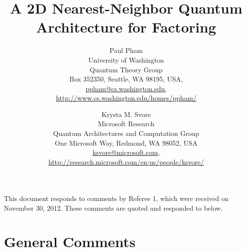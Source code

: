 \documentclass{article}
\newcommand{\email}[1]{\href{mailto:#1}{#1}}
\theoremstyle{plain} \newtheorem{lemma}{Lemma}
\begin{document}

\title{A 2D Nearest-Neighbor Quantum Architecture for Factoring}


%
%
\author{Paul Pham\\
University of Washington\\
Quantum Theory Group\\
Box 352350, Seattle, WA 98195, USA,\\
\email{ppham@cs.washington.edu},\\
\url{http://www.cs.washington.edu/homes/ppham/}
\and
Krysta M. Svore\\
Microsoft Research\\
Quantum Architectures and Computation Group\\
One Microsoft Way, Redmond, WA 98052, USA\\
\email{ksvore@microsoft.com},\\
\url{http://research.microsoft.com/en-us/people/ksvore/}
}

\maketitle

This document responds to comments by Referee 1, which were received on
November 30, 2012. These comments are quoted and responded to below.

\section{General Comments}
\end{document}
